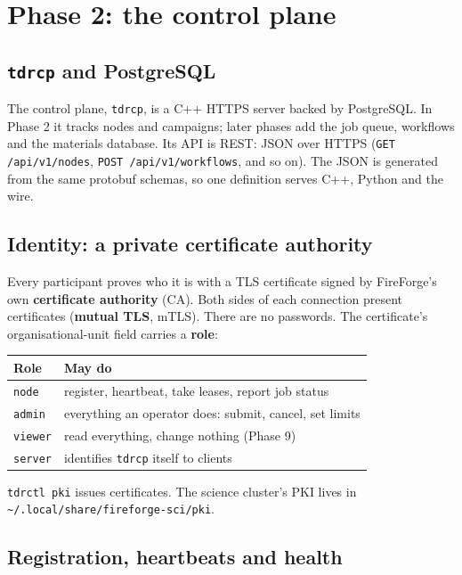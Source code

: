 \documentclass[11pt,a4paper]{report}
\newcommand{\code}[1]{\texttt{#1}}
\begin{document}
\chapter{Phase 2: the control plane}

\section{\code{tdrcp} and PostgreSQL}

The control plane, \code{tdrcp}, is a C++ HTTPS server backed by PostgreSQL. In Phase 2 it
tracks nodes and campaigns; later phases add the job queue, workflows and the materials
database. Its API is REST: JSON over HTTPS (\code{GET /api/v1/nodes}, \code{POST
/api/v1/workflows}, and so on). The JSON is generated from the same protobuf schemas, so one
definition serves C++, Python and the wire.

\section{Identity: a private certificate authority}

Every participant proves who it is with a TLS certificate signed by FireForge's own
\textbf{certificate authority} (CA). Both sides of each connection present certificates
(\textbf{mutual TLS}, mTLS). There are no passwords. The certificate's organisational-unit
field carries a \textbf{role}:

\begin{center}
\begin{tabular}{ll}
\toprule
Role & May do \\
\midrule
\code{node} & register, heartbeat, take leases, report job status \\
\code{admin} & everything an operator does: submit, cancel, set limits \\
\code{viewer} & read everything, change nothing (Phase 9) \\
\code{server} & identifies \code{tdrcp} itself to clients \\
\bottomrule
\end{tabular}
\end{center}

\code{tdrctl pki} issues certificates. The science cluster's PKI lives in
\code{\textasciitilde/.local/\allowbreak share/\allowbreak fireforge-sci/\allowbreak pki}.

\section{Registration, heartbeats and health}
\end{document}
